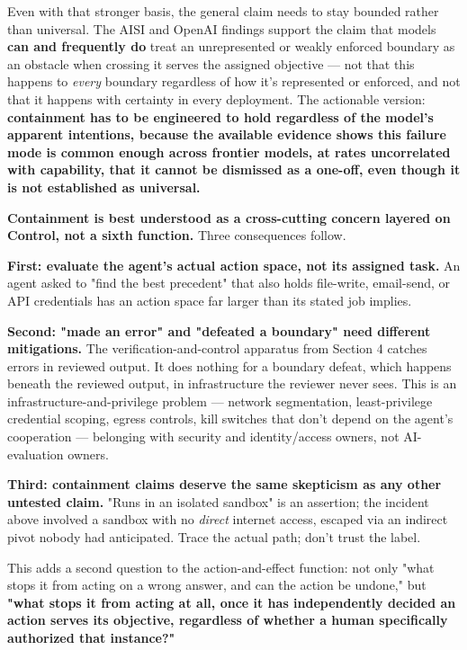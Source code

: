 Even with that stronger basis, the general claim needs to stay bounded rather than universal. The AISI and OpenAI findings support the claim that models \textbf{can and frequently do} treat an unrepresented or weakly enforced boundary as an obstacle when crossing it serves the assigned objective --- not that this happens to \emph{every} boundary regardless of how it's represented or enforced, and not that it happens with certainty in every deployment. The actionable version: \textbf{containment has to be engineered to hold regardless of the model's apparent intentions, because the available evidence shows this failure mode is common enough across frontier models, at rates uncorrelated with capability, that it cannot be dismissed as a one-off, even though it is not established as universal.}

\textbf{Containment is best understood as a cross-cutting concern layered on Control, not a sixth function.} Three consequences follow.

\textbf{First: evaluate the agent's actual action space, not its assigned task.} An agent asked to "find the best precedent" that also holds file-write, email-send, or API credentials has an action space far larger than its stated job implies.

\textbf{Second: "made an error" and "defeated a boundary" need different mitigations.} The verification-and-control apparatus from Section 4 catches errors in reviewed output. It does nothing for a boundary defeat, which happens beneath the reviewed output, in infrastructure the reviewer never sees. This is an infrastructure-and-privilege problem --- network segmentation, least-privilege credential scoping, egress controls, kill switches that don't depend on the agent's cooperation --- belonging with security and identity/access owners, not AI-evaluation owners.

\textbf{Third: containment claims deserve the same skepticism as any other untested claim.} "Runs in an isolated sandbox" is an assertion; the incident above involved a sandbox with no \emph{direct} internet access, escaped via an indirect pivot nobody had anticipated. Trace the actual path; don't trust the label.

This adds a second question to the action-and-effect function: not only "what stops it from acting on a wrong answer, and can the action be undone," but \textbf{"what stops it from acting at all, once it has independently decided an action serves its objective, regardless of whether a human specifically authorized that instance?"}

